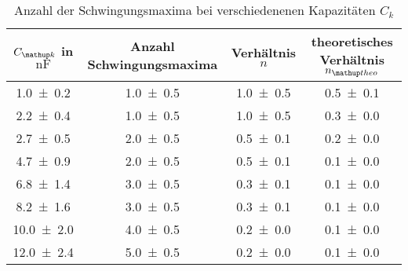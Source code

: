 \begin{table} 
\centering 
\caption{ Anzahl der Schwingungsmaxima bei verschiedenenen Kapazitäten $C_k$} 
\label{fig:teila_n_ck} 
\begin{tabular}{S S S S} 
\toprule  
{$C\ua{k}$ in $\si{\nano\farad}$} & {Anzahl Schwingungsmaxima} & {Verhältnis $n$} & {theoretisches Verhältnis $n\ua{theo}$}  \\ 
\midrule  
\num{1.0\pm0.2} & \num{1.0\pm0.5} & \num{1.0\pm0.5} & \num{0.5\pm0.1}\\ 
\num{2.2\pm0.4} & \num{1.0\pm0.5} & \num{1.0\pm0.5} & \num{0.3\pm0.0}\\ 
\num{2.7\pm0.5} & \num{2.0\pm0.5} & \num{0.5\pm0.1} & \num{0.2\pm0.0}\\ 
\num{4.7\pm0.9} & \num{2.0\pm0.5} & \num{0.5\pm0.1} & \num{0.1\pm0.0}\\ 
\num{6.8\pm1.4} & \num{3.0\pm0.5} & \num{0.3\pm0.1} & \num{0.1\pm0.0}\\ 
\num{8.2\pm1.6} & \num{3.0\pm0.5} & \num{0.3\pm0.1} & \num{0.1\pm0.0}\\ 
\num{10.0\pm2.0} & \num{4.0\pm0.5} & \num{0.2\pm0.0} & \num{0.1\pm0.0}\\ 
\num{12.0\pm2.4} & \num{5.0\pm0.5} & \num{0.2\pm0.0} & \num{0.1\pm0.0}\\
\bottomrule 
\end{tabular} 
\end{table}

